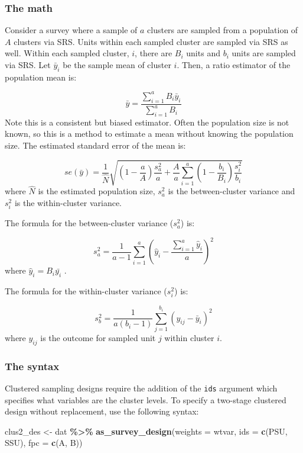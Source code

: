 \documentclass[
]{krantz}
\makeatletter
\newenvironment{Shaded}{\begin{snugshade}}{\end{snugshade}}
\newcommand{\AttributeTok}[1]{\textcolor[rgb]{0.27,0.27,0.27}{#1}}
\newcommand{\FunctionTok}[1]{\textcolor[rgb]{0.27,0.27,0.27}{\textbf{#1}}}
\newcommand{\NormalTok}[1]{#1}
\newcommand{\OtherTok}[1]{\textcolor[rgb]{0.37,0.37,0.37}{#1}}
\newcommand{\SpecialCharTok}[1]{\textcolor[rgb]{0.43,0.43,0.43}{\textbf{#1}}}
\newenvironment{kframe}{%
\medskip{}
\setlength{\fboxsep}{.8em}
 \def\at@end@of@kframe{}%
 \ifinner\ifhmode%
  \def\at@end@of@kframe{\end{minipage}}%
  \begin{minipage}{\columnwidth}%
 \fi\fi%
 \def\FrameCommand##1{\hskip\@totalleftmargin \hskip-\fboxsep
 \colorbox{shadecolor}{##1}\hskip-\fboxsep
     \hskip-\linewidth \hskip-\@totalleftmargin \hskip\columnwidth}%
 \MakeFramed {\advance\hsize-\width
   \@totalleftmargin\z@ \linewidth\hsize
   \@setminipage}}%
 {\par\unskip\endMakeFramed%
 \at@end@of@kframe}
\renewenvironment{Shaded}{\begin{kframe}}{\end{kframe}}
\makeatother
\begin{document}
\hypertarget{the-math-3}{%
\subsubsection*{The math}\label{the-math-3}}


Consider a survey where a sample of \(a\) clusters are sampled from a population of \(A\) clusters via SRS. Units within each sampled cluster are sampled via SRS as well. Within each sampled cluster, \(i\), there are \(B_i\) units and \(b_i\) units are sampled via SRS. Let \(\bar{y}_{i}\) be the sample mean of cluster \(i\). Then, a ratio estimator of the population mean is:

\[\bar{y}=\frac{\sum_{i=1}^a B_i \bar{y}_{i}}{ \sum_{i=1}^a B_i}\]
Note this is a consistent but biased estimator. Often the population size is not known, so this is a method to estimate a mean without knowing the population size. The estimated standard error of the mean is:

\[se(\bar{y})= \frac{1}{\hat{N}}\sqrt{\left(1-\frac{a}{A}\right)\frac{s_a^2}{a} + \frac{A}{a} \sum_{i=1}^a \left(1-\frac{b_i}{B_i}\right) \frac{s_i^2}{b_i} }\]
where \(\hat{N}\) is the estimated population size, \(s_a^2\) is the between-cluster variance and \(s_i^2\) is the within-cluster variance.

The formula for the between-cluster variance (\(s_a^2\)) is:

\[s_a^2=\frac{1}{a-1}\sum_{i=1}^a \left( \hat{y}_i - \frac{\sum_{i=1}^a \hat{y}_{i} }{a}\right)^2\]
where \(\hat{y}_i =B_i\bar{y_i}\) .

The formula for the within-cluster variance (\(s_i^2\)) is:

\[s_b^2=\frac{1}{a(b_i-1)} \sum_{j=1}^{b_i} \left(y_{ij}-\bar{y}_i\right)^2\]
where \(y_{ij}\) is the outcome for sampled unit \(j\) within cluster \(i\).

\hypertarget{the-syntax-3}{%
\subsubsection*{The syntax}\label{the-syntax-3}}


Clustered sampling designs require the addition of the \texttt{ids} argument which specifies what variables are the cluster levels. To specify a two-stage clustered design without replacement, use the following syntax:

\begin{Shaded}
\begin{Highlighting}[]
\NormalTok{clus2\_des }\OtherTok{\textless{}{-}}\NormalTok{ dat }\SpecialCharTok{\%\textgreater{}\%}
 \FunctionTok{as\_survey\_design}\NormalTok{(}\AttributeTok{weights =}\NormalTok{ wtvar, }
                  \AttributeTok{ids =} \FunctionTok{c}\NormalTok{(PSU, SSU), }
                  \AttributeTok{fpc =} \FunctionTok{c}\NormalTok{(A, B))}
\end{Highlighting}
\end{Shaded}
\end{document}
